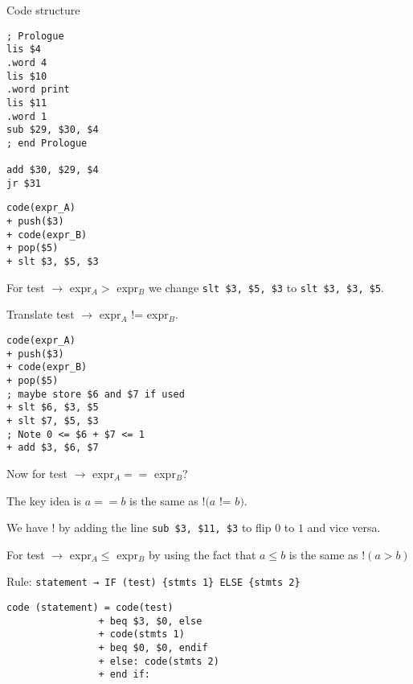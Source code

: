 \documentclass{article}
\begin{document}
Code structure

\begin{tcolorbox}
\begin{verbatim}
; Prologue
lis $4
.word 4
lis $10
.word print
lis $11
.word 1
sub $29, $30, $4
; end Prologue

add $30, $29, $4
jr $31
\end{verbatim}
\end{tcolorbox}


\begin{tcolorbox}
\begin{verbatim}
code(expr_A)
+ push($3)
+ code(expr_B)
+ pop($5)
+ slt $3, $5, $3
\end{verbatim}
\end{tcolorbox}

For test \(\to\) expr\(_{A} >\) expr\(_B\) we change
\texttt{slt\ \$3,\ \$5,\ \$3} to \texttt{slt\ \$3,\ \$3,\ \$5}.

Translate test \(\to\) expr\(_{A}\) != expr\(_{B}\).

\begin{tcolorbox}
\begin{verbatim}
code(expr_A)
+ push($3)
+ code(expr_B)
+ pop($5)
; maybe store $6 and $7 if used
+ slt $6, $3, $5
+ slt $7, $5, $3
; Note 0 <= $6 + $7 <= 1
+ add $3, $6, $7
\end{verbatim}
\end{tcolorbox}

Now for test \(\to\) expr\(_A ==\) expr\(_{B}\)?

The key idea is \(a == b\) is the same as \(!( a\) != \(b)\).

We have \(!\) by adding the line \texttt{sub\ \$3,\ \$11,\ \$3} to flip
\(0\) to \(1\) and vice versa.

For test \(\to\) expr\(_{A} \le\) expr\(_{B}\) by using the fact that
\(a \le b\) is the same as \(!(a > b)\)

Rule:
\texttt{statement\ →\ IF\ (test)\ \{stmts\ 1\}\ ELSE\ \{stmts\ 2\}}

\begin{tcolorbox}
\begin{verbatim}
code (statement) = code(test)
                + beq $3, $0, else
                + code(stmts 1)
                + beq $0, $0, endif
                + else: code(stmts 2)
                + end if:
\end{verbatim}
\end{tcolorbox}
\end{document}
